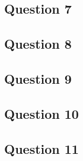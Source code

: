 \documentclass[12pt,english,]{article}
\begin{document}
\hypertarget{question-7}{%
\subsection{Question 7}\label{question-7}}

\hypertarget{question-8}{%
\subsection{Question 8}\label{question-8}}

\hypertarget{question-9}{%
\subsection{Question 9}\label{question-9}}

\hypertarget{question-10}{%
\subsection{Question 10}\label{question-10}}

\hypertarget{question-11}{%
\subsection{Question 11}\label{question-11}}
\end{document}
